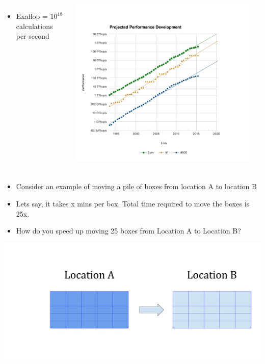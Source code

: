 \documentclass[10pt,t]{beamer}
\begin{document}
\begin{frame}[allowframebreaks,c]
\begin{itemize}
\begin{columns}[c]
\begin{itemize}
\item[] Exaflop = $10^{18}$ calculations per second
\end{itemize}
\includegraphics[width=0.95\textwidth]{./top500}
\end{columns}
\end{itemize}
\end{frame}

\begin{frame}
\frametitle{  }
\begin{itemize}
\item Consider an example of moving a pile of boxes from location A to location B
\item Lets say, it takes x mins per box. Total time required to move the boxes is 25x.
\item How do you speed up moving 25 boxes from Location A to Location B?
\end{itemize}
\includegraphics[width=\textwidth,clip=true]{./Serial}
\end{frame}
\end{document}
